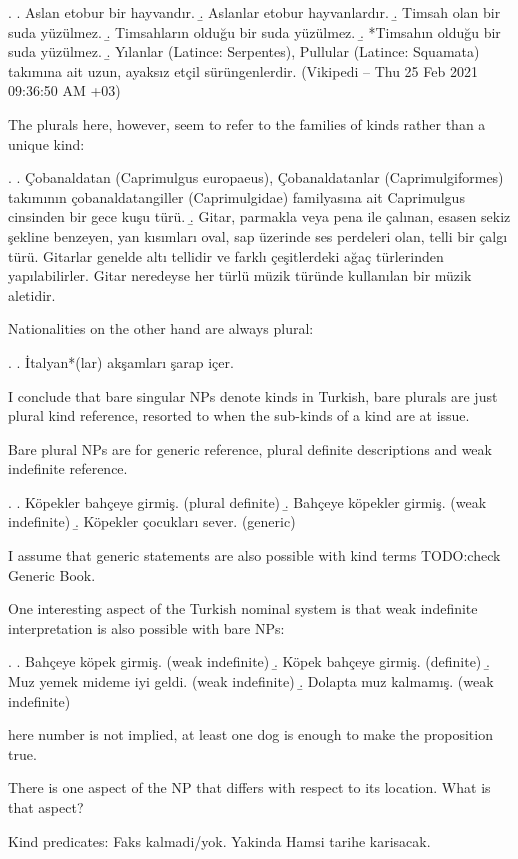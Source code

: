 \documentclass[11pt,a4paper]{article}
\begin{document}
\ex.
\a. Aslan etobur bir hayvandır.
\b. Aslanlar etobur hayvanlardır.
\b. Timsah olan bir suda yüzülmez.
\b. Timsahların olduğu bir suda yüzülmez.
\b. *Timsahın olduğu bir suda yüzülmez.
\b. Yılanlar (Latince: Serpentes), Pullular (Latince: Squamata) takımına ait uzun, ayaksız etçil sürüngenlerdir. (Vikipedi -- Thu 25 Feb 2021 09:36:50 AM +03)

The plurals here, however, seem to refer to the families of kinds rather than a unique kind:

\ex.
\a. Çobanaldatan (Caprimulgus europaeus), Çobanaldatanlar (Caprimulgiformes) takımının çobanaldatangiller (Caprimulgidae) familyasına ait Caprimulgus cinsinden bir gece kuşu türü.
\b. Gitar, parmakla veya pena ile çalınan, esasen sekiz şekline benzeyen, yan kısımları oval, sap üzerinde ses perdeleri olan, telli bir çalgı türü. Gitarlar genelde altı tellidir ve farklı çeşitlerdeki ağaç türlerinden yapılabilirler. Gitar neredeyse her türlü müzik türünde kullanılan bir müzik aletidir. 


Nationalities on the other hand are always plural:

\ex.
\a. İtalyan*(lar) akşamları şarap içer.

I conclude that bare singular NPs denote kinds in Turkish, bare plurals are just plural kind reference, resorted to when the sub-kinds of a kind are at issue.

Bare plural NPs are for generic reference, plural definite descriptions and weak indefinite reference.

\ex.
\a. Köpekler bahçeye girmiş. (plural definite)
\b. Bahçeye köpekler girmiş. (weak indefinite)
\b. Köpekler çocukları sever. (generic)

I assume that generic statements are also possible with kind terms TODO:check Generic Book.

One interesting aspect of the Turkish nominal system is that weak indefinite interpretation is also possible with bare NPs: 

\ex.
\a. Bahçeye köpek girmiş. (weak indefinite)
\b. Köpek bahçeye girmiş. (definite)
\b. Muz yemek mideme iyi geldi. (weak indefinite)
\b. Dolapta muz kalmamış. (weak indefinite)

here number is not implied, at least one dog is enough to make the proposition true.

There is one aspect of the NP that differs with respect to its location. What is that aspect?

Kind predicates:
Faks kalmadi/yok.
Yakinda Hamsi tarihe karisacak.
\end{document}

